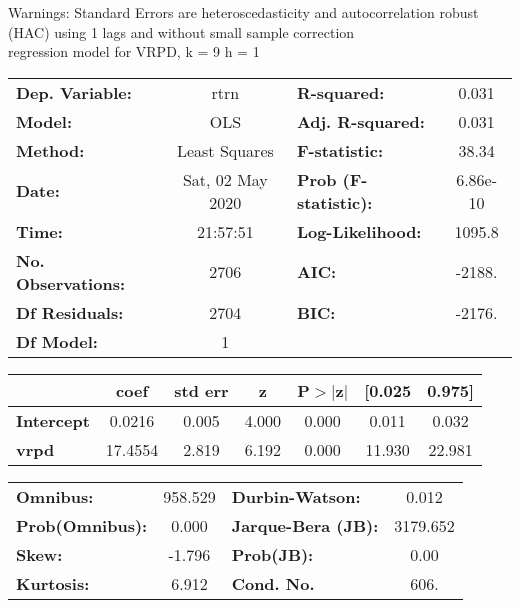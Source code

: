 Warnings: \newline
 [1] Standard Errors are heteroscedasticity and autocorrelation robust (HAC) using 1 lags and without small sample correction\\ 

regression model for VRPD, k = 9 h = 1\begin{center}
\begin{tabular}{lclc}
\toprule
\textbf{Dep. Variable:}    &       rtrn       & \textbf{  R-squared:         } &     0.031   \\
\textbf{Model:}            &       OLS        & \textbf{  Adj. R-squared:    } &     0.031   \\
\textbf{Method:}           &  Least Squares   & \textbf{  F-statistic:       } &     38.34   \\
\textbf{Date:}             & Sat, 02 May 2020 & \textbf{  Prob (F-statistic):} &  6.86e-10   \\
\textbf{Time:}             &     21:57:51     & \textbf{  Log-Likelihood:    } &    1095.8   \\
\textbf{No. Observations:} &        2706      & \textbf{  AIC:               } &    -2188.   \\
\textbf{Df Residuals:}     &        2704      & \textbf{  BIC:               } &    -2176.   \\
\textbf{Df Model:}         &           1      & \textbf{                     } &             \\
\bottomrule
\end{tabular}
\begin{tabular}{lcccccc}
                   & \textbf{coef} & \textbf{std err} & \textbf{z} & \textbf{P$> |$z$|$} & \textbf{[0.025} & \textbf{0.975]}  \\
\midrule
\textbf{Intercept} &       0.0216  &        0.005     &     4.000  &         0.000        &        0.011    &        0.032     \\
\textbf{vrpd}      &      17.4554  &        2.819     &     6.192  &         0.000        &       11.930    &       22.981     \\
\bottomrule
\end{tabular}
\begin{tabular}{lclc}
\textbf{Omnibus:}       & 958.529 & \textbf{  Durbin-Watson:     } &    0.012  \\
\textbf{Prob(Omnibus):} &   0.000 & \textbf{  Jarque-Bera (JB):  } & 3179.652  \\
\textbf{Skew:}          &  -1.796 & \textbf{  Prob(JB):          } &     0.00  \\
\textbf{Kurtosis:}      &   6.912 & \textbf{  Cond. No.          } &     606.  \\
\bottomrule
\end{tabular}
\end{center}

